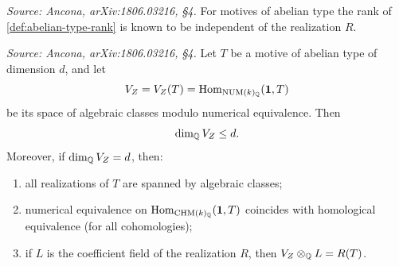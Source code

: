 \begin{remark}
  \label{rem:rank-indep}
  \textit{Source: Ancona, arXiv:1806.03216, §4.}
  For motives of abelian type the rank of \cref{def:abelian-type-rank} is known
  to be independent of the realization \(R\).
\end{remark}

\begin{proposition}
  \label{prop:motive-num-bound}
  \textit{Source: Ancona, arXiv:1806.03216, §4.}
  Let \(T\) be a motive of abelian type of dimension \(d\), and let
  \[V_Z = V_Z(T) = \mathrm{Hom}_{\mathrm{NUM}(k)_{\mathbb{Q}}}(\mathbf{1}, T)\]
  be its space of algebraic classes modulo numerical equivalence. Then
  \[\dim_{\mathbb{Q}} V_Z \le d.\]
  Moreover, if \(\dim_{\mathbb{Q}} V_Z = d\), then:
  \begin{enumerate}
    \item all realizations of \(T\) are spanned by algebraic classes;
    \item numerical equivalence on \(\mathrm{Hom}_{\mathrm{CHM}(k)_{\mathbb{Q}}}(\mathbf{1}, T)\) coincides with
      homological equivalence (for all cohomologies);
    \item if \(L\) is the coefficient field of the realization \(R\), then
      \(V_Z \otimes_{\mathbb{Q}} L = R(T)\).
  \end{enumerate}
\end{proposition}

